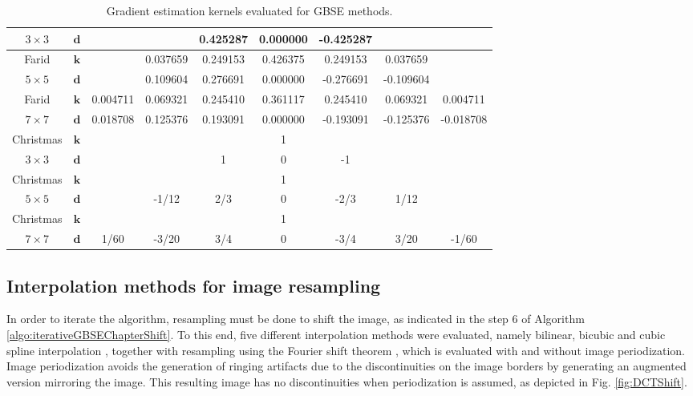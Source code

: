 \begin{table}[htpb]
\begin{tabular}{c|c|c|c|c|c|c|c|c}
$3 \times 3$ & $\mathbf{d}$ & & & 0.425287 & 0.000000 & -0.425287 & & \\ \hline
Farid  & $\mathbf{k}$ & & 0.037659 & 0.249153 & 0.426375 & 0.249153 & 0.037659 &  \\ 
$5 \times 5$ & $\mathbf{d}$ & & 0.109604 & 0.276691 & 0.000000 & -0.276691 & -0.109604& \\ \hline
Farid  & $\mathbf{k}$ & 0.004711 & 0.069321 & 0.245410 & 0.361117 & 0.245410 & 0.069321 &  0.004711\\ 
$7 \times 7$ & $\mathbf{d}$ & 0.018708 & 0.125376 & 0.193091 & 0.000000 & -0.193091 & -0.125376 & -0.018708 \\ \hline
Christmas  &  $\mathbf{k}$ &  &  &  & 1  &  &  &  \\ 
$3 \times 3$ & $\mathbf{d}$ &  &  &  1 & 0 & -1 &  &  \\ \hline
Christmas  & $\mathbf{k}$ &  &  &  & 1 &  &  &  \\ 
$5 \times 5$ & $\mathbf{d}$ &  & -1/12 & 2/3 & 0 & -2/3 & 1/12 &  \\ \hline
Christmas  &  $\mathbf{k}$ &  &  &  & 1 &  &  &  \\ 
$7 \times 7$ & $\mathbf{d}$ & 1/60  & -3/20 &  3/4 & 0 & -3/4 & 3/20  & -1/60 \\ \hline
\end{tabular}
\caption{Gradient estimation kernels evaluated for GBSE methods.}
\label{tab:gradEstimationKernels}	
\end{table}


\subsection{Interpolation methods for image resampling}
 \label{sec:interpolationChapter1} 
In order to iterate the algorithm, resampling must be done to shift the image, as indicated in the step 6 of Algorithm \ref{algo:iterativeGBSEChapterShift}. To this end, five different interpolation methods were evaluated, namely bilinear, bicubic \cite{keys1981} and cubic spline interpolation \cite{DeBoor2001}, together with resampling using the Fourier shift theorem \cite{FourierInt}, which is evaluated with and without image periodization. Image periodization avoids the generation of ringing artifacts due to the discontinuities on the image borders by generating an augmented version  mirroring the image. This resulting image has no discontinuities when periodization is assumed, as depicted in Fig. \ref{fig:DCTShift}.  

